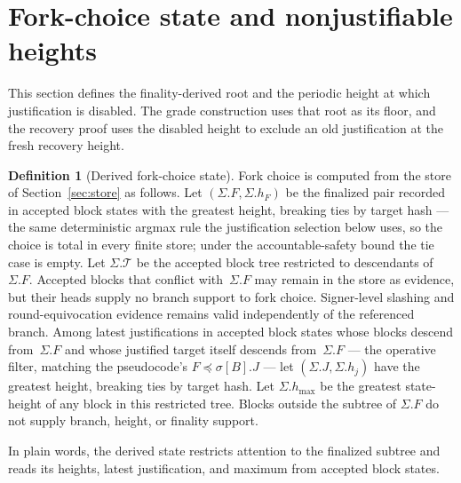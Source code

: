 \ifx\litemode\undefined\documentclass{article}\fi
\theoremstyle{plain}
\theoremstyle{definition}
\newtheorem{definition}{Definition}
\theoremstyle{remark}
\newcommand{\T}{\mathcal{T}}
\newcommand{\hmax}{h_{\max}}
\begin{document}
\section{Fork-choice state and nonjustifiable heights}\label{sec:fork-choice-state}

This section defines the finality-derived root and the periodic height at which
justification is disabled.  The grade construction uses that root as
its floor, and the recovery proof uses the disabled height to exclude an old
justification at the fresh recovery height.

\begin{definition}[Derived fork-choice state]\label{def:fork-state}
Fork choice is computed from the store of Section~\ref{sec:store} as follows.
Let \((\Sigma.F,\Sigma.h_F)\) be the finalized pair recorded in
accepted block states with the greatest height, breaking ties by target
hash --- the same deterministic argmax rule the justification selection
below uses, so the choice is total in every finite store; under the
accountable-safety bound the tie case is empty.  Let \(\Sigma.\T\) be
the accepted block tree restricted to descendants of~\(\Sigma.F\).  Accepted blocks that conflict
with~\(\Sigma.F\) may remain in the store as evidence, but their heads supply
no branch support to fork choice.  Signer-level slashing and round-equivocation
evidence remains valid independently of the referenced branch.  Among latest
justifications in accepted block states whose
blocks descend from~\(\Sigma.F\) and whose justified target itself
descends from~\(\Sigma.F\) --- the operative filter, matching the
pseudocode's \(F\preceq\sigma[B].J\) --- let \((\Sigma.J,\Sigma.h_j)\) have the greatest
height, breaking ties by target hash.  Let
\(\Sigma.\hmax\) be the greatest state-height of any block in this restricted
tree.  Blocks outside the subtree of \(\Sigma.F\) do not supply branch,
height, or finality support.

In plain words, the derived state restricts attention to the finalized
subtree and reads its heights, latest justification, and maximum from
accepted block states.
\end{definition}
\end{document}

